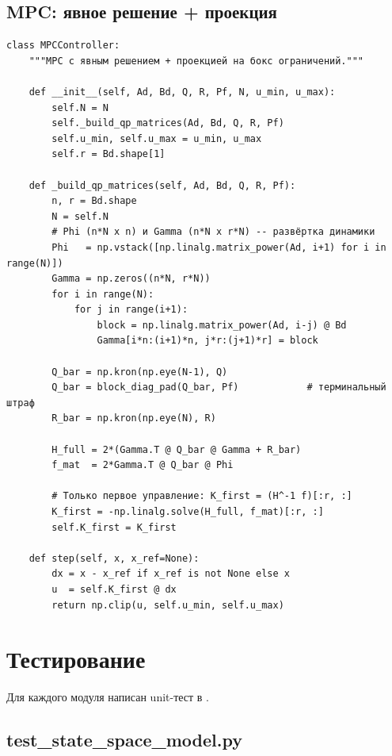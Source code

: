 \subsection{MPC: явное решение + проекция}

\begin{filebox}[title={\filepath{pi\_nodes/control/mpc\_controller.py} (упрощённо)}]
\begin{lstlisting}[style=pythonstyle]
class MPCController:
    """MPC c явным решением + проекцией на бокс ограничений."""

    def __init__(self, Ad, Bd, Q, R, Pf, N, u_min, u_max):
        self.N = N
        self._build_qp_matrices(Ad, Bd, Q, R, Pf)
        self.u_min, self.u_max = u_min, u_max
        self.r = Bd.shape[1]

    def _build_qp_matrices(self, Ad, Bd, Q, R, Pf):
        n, r = Bd.shape
        N = self.N
        # Phi (n*N x n) и Gamma (n*N x r*N) -- развёртка динамики
        Phi   = np.vstack([np.linalg.matrix_power(Ad, i+1) for i in range(N)])
        Gamma = np.zeros((n*N, r*N))
        for i in range(N):
            for j in range(i+1):
                block = np.linalg.matrix_power(Ad, i-j) @ Bd
                Gamma[i*n:(i+1)*n, j*r:(j+1)*r] = block

        Q_bar = np.kron(np.eye(N-1), Q)
        Q_bar = block_diag_pad(Q_bar, Pf)            # терминальный штраф
        R_bar = np.kron(np.eye(N), R)

        H_full = 2*(Gamma.T @ Q_bar @ Gamma + R_bar)
        f_mat  = 2*Gamma.T @ Q_bar @ Phi

        # Только первое управление: K_first = (H^-1 f)[:r, :]
        K_first = -np.linalg.solve(H_full, f_mat)[:r, :]
        self.K_first = K_first

    def step(self, x, x_ref=None):
        dx = x - x_ref if x_ref is not None else x
        u  = self.K_first @ dx
        return np.clip(u, self.u_min, self.u_max)
\end{lstlisting}
\end{filebox}

\section{Тестирование}
\label{sec:testing}

Для каждого модуля написан unit-тест в .

\subsection{test\_state\_space\_model.py}

